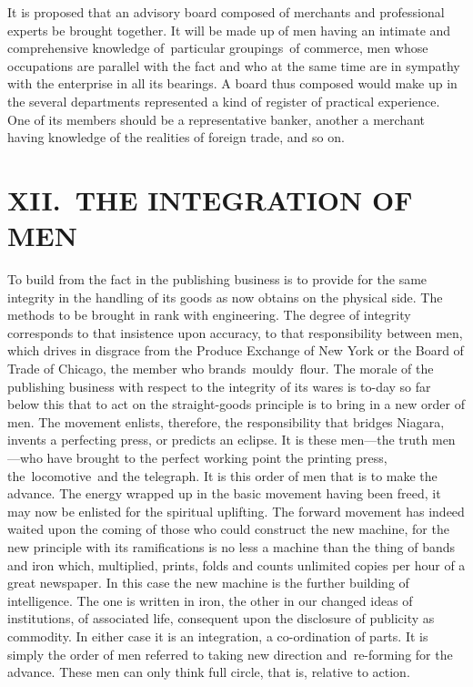 \documentclass[openany,nobib]{tufte-book}
\begin{document}
It is proposed that an advisory board composed of merchants and
professional experts be brought together. It will be made up of men
having an intimate and comprehensive knowledge of~particular
groupings~of commerce, men whose occupations are parallel with the fact
and who at the same time are in sympathy with the enterprise in all its
bearings. A board thus composed would make up in the several departments
represented a kind of register of practical experience. One of its
members should be a representative banker, another a merchant having
knowledge of the realities of foreign trade, and so on.~~

\hypertarget{xii-the-integration-of-men}{%
\section{XII.~THE INTEGRATION OF
MEN}\label{xii-the-integration-of-men}}

To build from the fact in the publishing business is to provide for the
same integrity in the handling of its goods as now obtains on the
physical side. The methods to be brought in rank with engineering. The
degree of integrity corresponds to that insistence upon accuracy, to
that responsibility between men, which drives in disgrace from the
Produce Exchange of New York or the Board of Trade of Chicago, the
member who brands~mouldy~flour. The morale of the publishing business
with respect to the integrity of its wares is to-day so far below this
that to act on the straight-goods principle is to bring in a new order
of men. The movement enlists, therefore, the responsibility that bridges
Niagara, invents a perfecting press, or predicts an eclipse. It is these
men---the truth men---who have brought to the perfect working point the
printing press, the~locomotive~and the telegraph. It is this order of
men that is to make the advance. The energy wrapped up in the basic
movement having been freed, it may now be enlisted for the spiritual
uplifting. The forward movement has indeed waited upon the coming of
those who could construct the new machine, for the new principle with
its ramifications is no less a machine than the thing of bands and iron
which, multiplied, prints, folds and counts unlimited copies per hour of
a great newspaper. In this case the new machine is the further building
of intelligence. The one is written in iron, the other in our changed
ideas of institutions, of associated life, consequent upon the
disclosure of publicity as commodity. In either case it is an
integration, a co-ordination of parts. It is simply the order of men
referred to taking new direction and~re-forming for the advance. These
men can only think full circle, that is, relative to action.~
\end{document}
